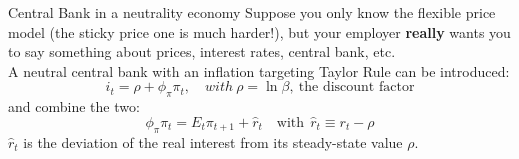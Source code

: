 \documentclass{beamer}
\begin{document}
\begin{frame}{Central Bank in a neutrality economy}
  Suppose you only know the flexible price model (the sticky price one is much harder!), but your employer \textbf{really} wants you to say something about prices, interest rates, central bank, etc. \\
\vfill
  A neutral central bank with an inflation targeting Taylor Rule can be introduced:
  \begin{equation*}
	i_t = \rho + \phi_\pi \pi_t, \quad{with} \ \rho=\ln \beta, \ \text{the discount factor}
  \end{equation*}
  and combine the two:
  \begin{equation*}
	\phi_\pi \pi_t = E_t \pi_{t+1} + \hat r_t \quad \text{with} \ \ \hat r_t \equiv r_t - \rho
  \end{equation*}
  $\hat r_t$ is the deviation of the real interest from its steady-state value $\rho$.
\end{frame}
\end{document}
